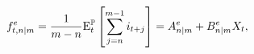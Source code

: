 \begin{equation*}
	f_{t,n | m}^{e} = \frac{1}{m - n} \mathrm{E}^{\mathbb{P}}_{t} \left[ \sum_{j = n} ^{m-1} i_{t+j} \right] = A_{n | m}^{e} + B_{n | m}^{e} X_{t} ,
\end{equation*}
